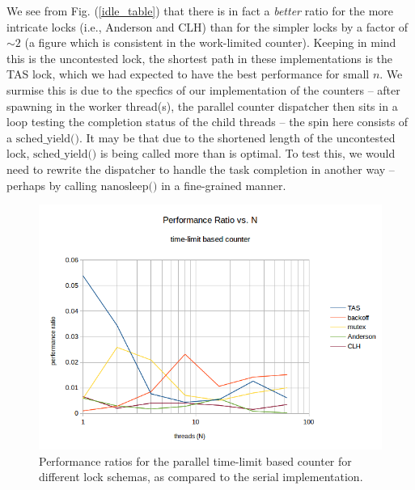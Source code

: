 \documentclass{article}
\newcommand{\figref}[1]{Fig. (\ref{#1})}
\newcommand{\ti}[1]{\emph{#1}}
\newcommand{\cpart}[1]{\newblock{\LARGE {\\\\#1}}}
\newcommand{\code}[1]{\texttt{$\text{#1}$}}
\begin{document}
We see from \figref{idle_table} that there is in fact a \ti{better} ratio for the more intricate locks (i.e., Anderson and CLH) than for the simpler locks by a 
factor of $\sim 2$ (a figure which is consistent in the work-limited counter). Keeping in mind this is the uncontested lock, the shortest path in these 
implementations is the TAS lock, which we had expected to have the best performance for small $n$. We surmise this is due to the specfics of our implementation of 
the counters -- after spawning in the worker thread(s), the parallel counter dispatcher then sits in a loop testing the completion status of the child threads -- 
the spin here consists of a \code{sched\_yield()}. It may be that due to the shortened length of the uncontested lock, \code{sched\_yield()} is being called more 
than is optimal. To test this, we would need to rewrite the dispatcher to handle the task completion in another way -- perhaps by calling \code{nanosleep()} in a 
fine-grained manner.

\cpart{Lock Scaling}

\begin{figure}
\begin{center}
	\includegraphics[scale=.8]{counter_3.png}
	\caption{Performance ratios for the parallel time-limit based counter for different lock schemas, as compared to the serial implementation.}
	\label{counter_3}
\end{center}
\end{figure}
\end{document}
